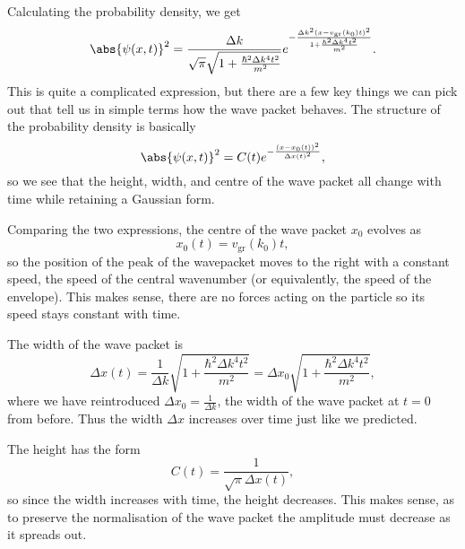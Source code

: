 \documentclass[../quantum_mechanics.tex]{subfiles}
\begin{document}
            Calculating the probability density, we get
            \begin{equation}
                \abs{\psi(x,t)}^2=\frac{\Delta k}{\sqrt{\pi}\sqrt{1+\frac{\hbar^2\Delta k^4t^2}{m^2}}}e^{-\frac{\Delta k^2(x-v_\text{gr}(k_0)t)^2}{1+\frac{\hbar^2\Delta k^4t^2}{m^2}}}.
            \end{equation}
            This is quite a complicated expression, but there are a few key things we can pick out that tell us in simple terms how the wave packet behaves.
            The structure of the probability density is basically
            \begin{equation}
                \abs{\psi(x,t)}^2=C(t)e^{-\frac{(x-x_0(t))^2}{\Delta x(t)^2}},
            \end{equation}
            so we see that the height, width, and centre of the wave packet all change with time while retaining a Gaussian form.
            
            Comparing the two expressions, the centre of the wave packet $x_0$ evolves as
            \begin{equation}
                x_0(t)=v_\text{gr}(k_0)t,
            \end{equation}
            so the position of the peak of the wavepacket moves to the right with a constant speed, the speed of the central wavenumber (or equivalently, the speed of the envelope).
            This makes sense, there are no forces acting on the particle so its speed stays constant with time.

            The width of the wave packet is
            \begin{equation}
                \Delta x(t)=\frac{1}{\Delta k}\sqrt{1+\frac{\hbar^2\Delta k^4t^2}{m^2}}=\Delta x_0\sqrt{1+\frac{\hbar^2\Delta k^4t^2}{m^2}},
            \end{equation}
            where we have reintroduced $\Delta x_0=\frac{1}{\Delta k}$, the width of the wave packet at $t=0$ from before.
            Thus the width $\Delta x$ increases over time just like we predicted.

            The height has the form
            \begin{equation}
                C(t)=\frac{1}{\sqrt{\pi}\Delta x(t)},
            \end{equation}
            so since the width increases with time, the height decreases.
            This makes sense, as to preserve the normalisation of the wave packet the amplitude must decrease as it spreads out.
\end{document}
